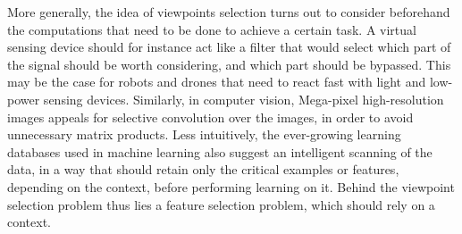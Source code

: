 \documentclass{article}
\begin{document}
More generally, the idea of viewpoints selection turns out to consider beforehand the computations that need to be done to achieve a certain task. A virtual sensing device should for instance act like a filter that would select which part of the signal should be worth considering, and which part should be bypassed. 
This may be the case for robots and drones  that need to react fast with light and low-power sensing devices. Similarly, in computer vision, Mega-pixel high-resolution images appeals for selective convolution over the images, in order to avoid unnecessary matrix products. Less intuitively, the ever-growing  learning databases used in machine learning also suggest an intelligent scanning of the data, in a way that should retain only the critical examples or features, depending on the context, before performing learning on it.  
Behind the viewpoint selection problem thus lies a feature selection problem, which should rely on a context. 






\end{document}

